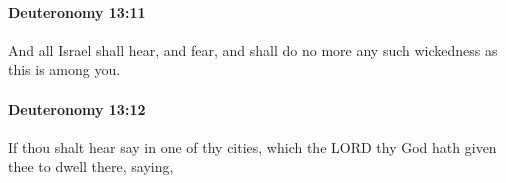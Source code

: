 		\paragraph{Deuteronomy 13:11} %
			\label{DEUTERONOMY-13-11}

			And all Israel shall hear, and fear, and shall do no more any such wickedness as this is among you.


		\paragraph{Deuteronomy 13:12} %
			\label{DEUTERONOMY-13-12}

			If thou shalt hear say in one of thy cities, which the LORD thy God hath given thee to dwell there, saying,


